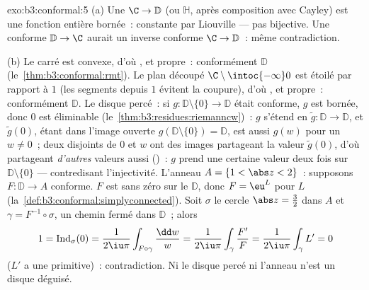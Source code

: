\begin{solution}{exo:b3:conformal:5}
(a) Une  $\C \to \mathbb D$ (ou $\mathbb
H$, après composition avec Cayley) est une fonction entière
bornée~: constante par Liouville --- pas bijective. Une
conforme $\mathbb D \to \C$ aurait un inverse conforme $\C
\to \mathbb D$~: même contradiction.

(b) Le carré est convexe, d'où , et
propre~: conformément $\mathbb D$
(le~\cref{thm:b3:conformal:rmt}). Le plan découpé
$\C\setminus\intoc{-\infty}0$ est étoilé par rapport à $1$
(les segments depuis $1$ évitent la coupure), d'où
, et propre~: conformément $\mathbb D$.
Le disque percé~: si $g \colon \mathbb D\setminus\{0\} \to
\mathbb D$ était conforme, $g$ est bornée, donc $0$ est
éliminable (le~\cref{thm:b3:residues:riemanncw})~: $g$
s'étend en $\tilde g \colon \mathbb D \to \mathbb D$, et
$\tilde g(0)$, étant dans l'image ouverte $g(\mathbb
D\setminus\{0\}) = \mathbb D$, est aussi $g(w)$ pour un $w
\neq 0$~; deux  disjoints de $0$ et $w$ ont des
images  partageant la valeur $\tilde g(0)$, d'où
partageant \emph{d'autres} valeurs aussi ()~: $g$
prend une certaine valeur deux fois sur $\mathbb
D\setminus\{0\}$ --- contredisant l'injectivité. L'anneau
$A = \{1 < \abs z < 2\}$~: supposons $F \colon \mathbb D
\to A$ conforme. $F$ est sans zéro sur le  $\mathbb D$, donc $F = \eu^L$ pour $L$ 
(la~\cref{def:b3:conformal:simplyconnected}). Soit $\sigma$
le cercle $\abs z = \frac32$ dans $A$ et $\gamma =
F^{-1}\circ\sigma$, un chemin fermé dans $\mathbb D$~; alors
\[
1 = \operatorname{Ind}_\sigma(0)
= \frac1{2\iu\pi}\int_{F\circ\gamma}\frac{\dd w}{w}
= \frac1{2\iu\pi}\int_\gamma\frac{F'}{F}
= \frac1{2\iu\pi}\int_\gamma L' = 0
\]
($L'$ a une primitive)~: contradiction. Ni le disque percé
ni l'anneau n'est un disque déguisé.
\end{solution}

